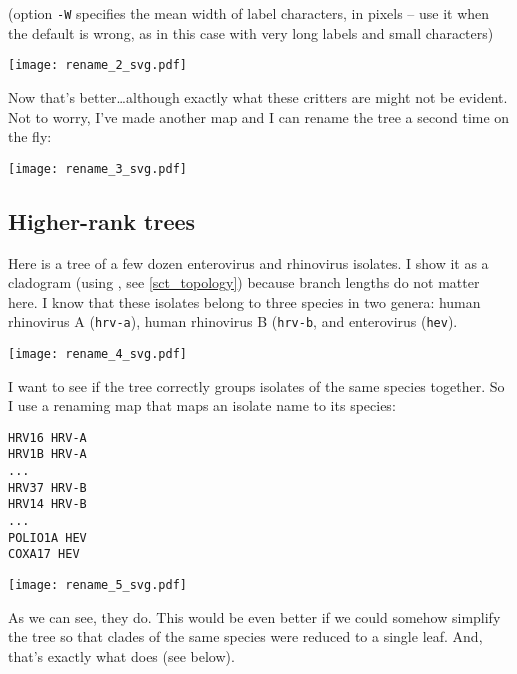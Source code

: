 
(option \texttt{-W} specifies the mean width of label characters, in
pixels -- use it when the default is wrong, as in this case with very long
labels and small characters)
\begin{center}
\texttt{[image: rename\_2\_svg.pdf]}
\end{center}

\noindent{}Now that's better\ldots although exactly what these critters are
might not be evident. Not to worry, I've made another map and I can rename the
tree a second time on the fly:


\begin{center}
\texttt{[image: rename\_3\_svg.pdf]}
\end{center}

\subsection{Higher-rank trees}
\label{sct_higher_rank}

Here is a tree of a few dozen enterovirus and rhinovirus isolates. I show it as
a cladogram (using \topology, see \ref{sct_topology}) because branch lengths do
not matter here. I know that these isolates belong to three species in two
genera: human rhinovirus A (\texttt{hrv-a}), human rhinovirus B
(\texttt{hrv-b}, and enterovirus (\texttt{hev}). 


\begin{center}
\texttt{[image: rename\_4\_svg.pdf]}
\end{center}

\noindent{}I want to see if the tree correctly groups isolates of the same
species together. So I use a renaming map that maps an isolate name to its
species:
\begin{verbatim}
HRV16 HRV-A
HRV1B HRV-A
...
HRV37 HRV-B
HRV14 HRV-B
...
POLIO1A HEV
COXA17 HEV
\end{verbatim}


\begin{center}
\texttt{[image: rename\_5\_svg.pdf]}
\end{center}

\noindent{}As we can see, they do. This would be even better if we could
somehow simplify the tree so that clades of the same species were reduced to a
single leaf. And, that's exactly what \condense{} does (see below).
